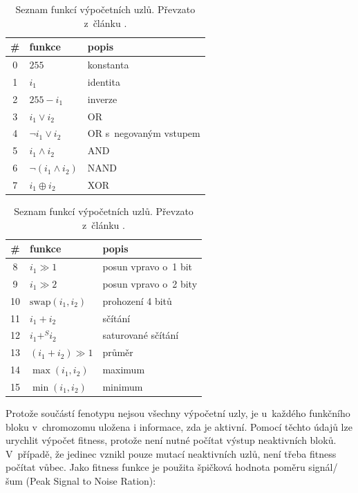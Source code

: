 \begin{table}[htb]
    \begin{minipage}[t]{.5\textwidth}
        \small\centering\begin{tabular}{|c|l|l|}
            \hline
            \# & funkce & popis \\
            \hline
            0 & $255$ & konstanta \\
            1 & $i_1$ & identita \\
            2 & $255 - i_1$ & inverze \\
            3 & $i_1 \vee i_2$ & OR \\
            4 & $\neg i_1 \vee i_2$ & OR s~negovaným vstupem \\
            5 & $i_1 \wedge i_2$ & AND \\
            6 & $\neg (i_1 \wedge i_2)$ & NAND \\
            7 & $i_1 \oplus i_2$ & XOR \\
            \hline
        \end{tabular}

    \end{minipage}
    \begin{minipage}[t]{.5\textwidth}
        \small\centering\begin{tabular}{|c|l|l|}
            \hline
            \# & funkce & popis \\
            \hline
            8 & $i_1 \gg 1$ & posun vpravo o~1 bit \\
            9 & $i_1 \gg 2$ & posun vpravo o~2 bity \\
            10 & $\mathrm{swap}(i_1, i_2)$ & prohození 4 bitů \\
            11 & $i_1 + i_2$ & sčítání \\
            12 & $i_1 +^S i_2$ & saturované sčítání \\
            13 & $(i_1 + i_2) \gg 1$ & průměr \\
            14 & $\max(i_1, i_2)$ & maximum \\
            15 & $\min(i_1, i_2)$ & minimum \\
            \hline
        \end{tabular}

    \end{minipage}
    \caption{Seznam funkcí výpočetních uzlů. Převzato z~článku \cite{SikuPPSN}.}
    \label{tabCGPFunctions}
\end{table}

Protože součástí fenotypu nejsou všechny výpočetní uzly, je u~každého funkčního bloku v~chromozomu uložena i informace, zda je aktivní. Pomocí těchto údajů lze urychlit výpočet fitness, protože není nutné počítat výstup neaktivních bloků. V~případě, že jedinec vznikl pouze mutací neaktivních uzlů, není třeba fitness počítat vůbec. Jako fitness funkce je použita špičková hodnota poměru signál/šum (Peak Signal to Noise Ration):

